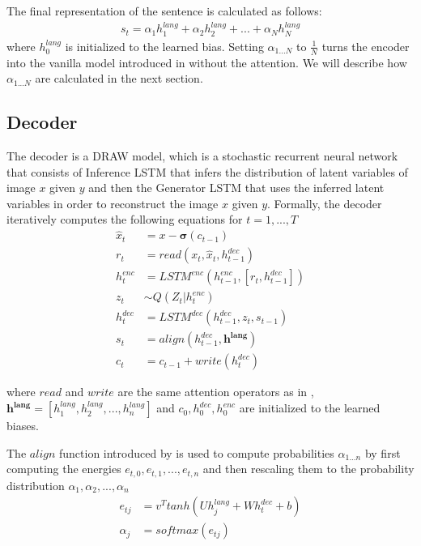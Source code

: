 \documentclass{article} %
\newcommand{\sigmoid}{\boldsymbol{\sigma}}
\newcommand{\hlang}{h^{lang}}
\newcommand{\hlangall}{\boldsymbol{h^{lang}}}
\newcommand{\hdec}{h^{dec}}
\newcommand{\henc}{h^{enc}}
\newcommand{\readop}{\mathit{read}}
\newcommand{\writeop}{\mathit{write}}
\newcommand{\encoder}{\mathit{LSTM}^{enc}}
\newcommand{\decoder}{\mathit{LSTM}^{dec}}
\newcommand{\canv}{c}
\newcommand{\lat}{z}
\newcommand{\Lat}{Z}
\newcommand{\post}{Q}
\begin{document}
The final representation of the sentence is calculated as follows:
\begin{align}
s_{t} = \alpha_{1}\hlang_{1} + \alpha_{2}\hlang_{2} + ... + \alpha_{N}\hlang_{N}
\end{align}
where $\hlang_{0}$ is initialized to the learned bias.
Setting $\alpha_{1...N}$ to $\frac{1}{N}$ turns the encoder into the vanilla model introduced in \citep{cho_mt} without the attention. We will describe how $\alpha_{1...N}$ are calculated in the next section.

\subsection{Decoder}

The decoder is a DRAW model, which is a stochastic recurrent neural network that consists of Inference LSTM that infers the distribution of latent variables of image $x$ given $y$ and then the Generator LSTM that uses the inferred latent variables in order to reconstruct the image $x$ given $y$. Formally, the decoder iteratively computes the following equations for $t=1,...,T$
\begin{align}
\label{eq:x_hat}
\hat{x}_t &= x-\sigmoid(\canv_{t-1})\\
\label{eq:read}
r_t &= \readop(x_t, \hat{x}_t, \hdec_{t-1})\\
\henc_t &= \encoder(\henc_{t-1}, [r_t, \hdec_{t-1}])\\
\lat_t &\sim \post(\Lat_t|\henc_t)\\
\hdec_t &= \decoder(\hdec_{t-1}, z_t, s_{t-1})\\
s_{t} &= align(\hdec_{t-1}, \hlangall)\\
\label{eq:write}
\canv_t &= \canv_{t-1} + \writeop(\hdec_t)
\end{align}

where $\readop$ and $\writeop$ are the same attention operators as in \citep{gregor_draw}, $\hlangall = [\hlang_{1}, \hlang_{2}, ..., \hlang_{n}]$ and $\canv_{0}, \hdec_{0}, \henc_{0}$ are initialized to the learned biases.

The $align$ function introduced by \cite{bahdanau_mt} is used to compute probabilities $\alpha_{1...n}$ by first computing the energies $e_{t,0}, e_{t,1}, ..., e_{t,n}$ and then rescaling them to the probability distribution $\alpha_{1}, \alpha_{2}, ..., \alpha_{n}$
\begin{align}
e_{tj} &= v^{T}tanh(U\hlang_{j} + W\hdec_{t} + b)\\
\alpha_{j} &= softmax(e_{tj})
\end{align}
\end{document}

